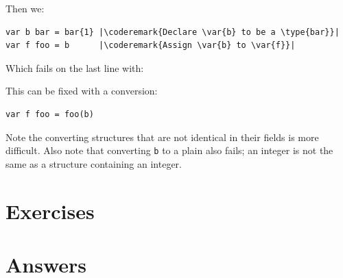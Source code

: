 Then we:
\begin{lstlisting}
var b bar = bar{1} |\coderemark{Declare \var{b} to be a \type{bar}}|
var f foo = b	   |\coderemark{Assign \var{b} to \var{f}}|
\end{lstlisting}
Which fails on the last line with:

\noindent{}

\noindent{}This can be fixed with a conversion:
\begin{lstlisting}
var f foo = foo(b)
\end{lstlisting}
Note the converting structures that are not identical in their fields
is more difficult. Also note that converting \lstinline{b} to a plain
 also fails; an integer is not the same as a structure containing
an integer.

\section{Exercises}












\cleardoublepage
\section{Answers}
\shipoutAnswer
